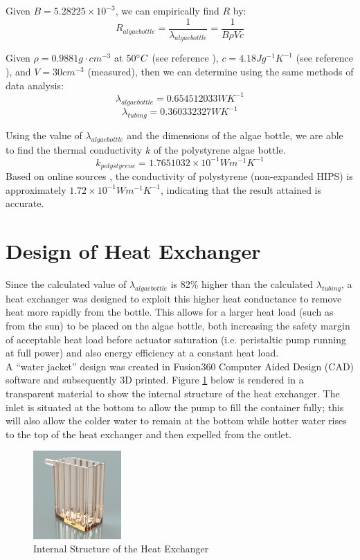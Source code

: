 \documentclass[10pt,a4paper]{IEEEtran}
\begin{document}
	Given $B = 5.28225\times 10^{-3}$, we can empirically find $R$ by:
	$$R_{algae bottle} = \frac{1}{\lambda_{algae bottle}} = \frac{1}{B \rho V c}$$
	
	Given $\rho = 0.9881 g \cdot cm^{-3}$ at $50 \degree C$ (see reference \cite{waterDensity}), $c = 4.18 J g^{-1} K^{-1}$ (see reference \cite{waterHeatCap}), and $V = 30 cm^{-3}$ (measured), then we can determine using the same methods of data analysis:
	$$\lambda_{algae bottle} = 0.654512033 W K^{-1}$$
	$$\lambda_{tubing} = 0.360332327W K^{-1}$$
	
	Using the value of $\lambda_{algae bottle}$ and the dimensions of the algae bottle, we are able to find the thermal conductivity $k$ of the polystyrene \cite{polystyreneBottle} algae bottle.
	$$k_{polystyrene} = 1.7651032 \times 10^{-1} W m^{-1} K^{-1}$$
	Based on online sources \cite{polystyreneConductivity}, the conductivity of polystyrene (non-expanded HIPS) is approximately $1.72 \times 10^{-1} W m^{-1} K^{-1}$, indicating that the result attained is accurate.
	
	
 	\section{Design of Heat Exchanger}
 	Since the calculated value of $\lambda_{algae bottle}$ is 82\% higher than the calculated $\lambda_{tubing}$, a heat exchanger was designed to exploit this higher heat conductance to remove heat more rapidly from the bottle. This allows for a larger heat load (such as from the sun) to be placed on the algae bottle, both increasing the safety margin of acceptable heat load before actuator saturation (i.e. peristaltic pump running at full power) and also energy efficiency at a constant heat load.\\
 	
 	A ``water jacket'' design was created in Fusion360 Computer Aided Design (CAD) software and subsequently 3D printed. Figure \ref{fig:heat_exchanger_side} below is rendered in a transparent material to show the internal structure of the heat exchanger. The inlet is situated at the bottom to allow the pump to fill the container fully; this will also allow the colder water to remain at the bottom while hotter water rises to the top of the heat exchanger and then expelled from the outlet.
 		\begin{figure}[H]
 			\begin{center}
 				\includegraphics[width=0.3\textwidth]{heat_exchanger_side.png}
 				\caption{Internal Structure of the Heat Exchanger}
 				\label{fig:heat_exchanger_side}
 			\end{center}
 		\end{figure}
 	
\end{document}
